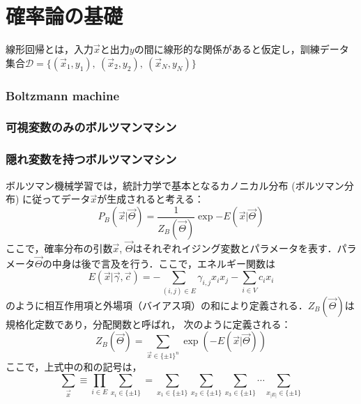 \part{確率論の基礎}

線形回帰とは，入力$\vec{x}$と出力$y$の間に線形的な関係があると仮定し，訓練データ集合$\mathcal{D}=\{(\vec{x}_1,y_1),\ (\vec{x}_2,y_2),\ (\vec{x}_N,y_N)\}$
\section{Boltzmann machine}
\section{可視変数のみのボルツマンマシン}
\section{隠れ変数を持つボルツマンマシン}
ボルツマン機械学習では，統計力学で基本となるカノニカル分布 (ボルツマン分布) に従ってデータ$\Vec{x}$が生成されると考える：
\begin{equation}
    P_B(\Vec{x}|\Vec{\Theta}) = \frac{1}{Z_B(\Vec{\Theta})}\exp{-E(\Vec{x}|\Vec{\Theta})}
\end{equation}
ここで，確率分布の引数$\Vec{x}$, $\Vec{\Theta}$はそれぞれイジング変数とパラメータを表す．パラメータ$\Vec{\Theta}$の中身は後で言及を行う．ここで，エネルギー関数は
\begin{equation}
    E(\Vec{x}|\Vec{\gamma},\Vec{c}) = -\sum_{(i,j)\in E}\gamma_{i,j} x_i x_j - \sum_{i \in V}c_ix_i
\end{equation}
のように相互作用項と外場項（バイアス項）の和により定義される．$Z_B(\vec{\Theta})$は規格化定数であり，分配関数と呼ばれ，
次のように定義される：
\begin{equation}
    Z_B(\vec{\Theta}) = \sum_{\Vec{x}\in\{\pm1\}^{n}} \exp{(-E(\Vec{x}|\Vec{\Theta}))}
\end{equation}
ここで，上式中の和の記号は，
\begin{equation}
    \sum_{\Vec{x}} \equiv \prod_{i\in E} \sum_{x_i\in\{\pm 1\}} 
    = \sum_{x_1\in\{\pm 1\}} \sum_{x_2\in\{\pm 1\}} \sum_{x_3\in\{\pm 1\}} 
    \cdots \sum_{x_|E|\in\{\pm 1\}} 
\end{equation}


